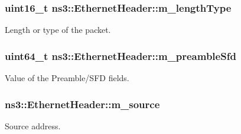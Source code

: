 \subsubsection[{\texorpdfstring{m\+\_\+length\+Type}{m_lengthType}}]{\setlength{\rightskip}{0pt plus 5cm}uint16\+\_\+t ns3\+::\+Ethernet\+Header\+::m\+\_\+length\+Type\hspace{0.3cm}{\ttfamily [private]}}\hypertarget{classns3_1_1EthernetHeader_a08ce14d49c74d332060686be27aff11f}{}\label{classns3_1_1EthernetHeader_a08ce14d49c74d332060686be27aff11f}


Length or type of the packet. 

\subsubsection[{\texorpdfstring{m\+\_\+preamble\+Sfd}{m_preambleSfd}}]{\setlength{\rightskip}{0pt plus 5cm}uint64\+\_\+t ns3\+::\+Ethernet\+Header\+::m\+\_\+preamble\+Sfd\hspace{0.3cm}{\ttfamily [private]}}\hypertarget{classns3_1_1EthernetHeader_ab0d0ceb81df7ef3fb6266bef57f43876}{}\label{classns3_1_1EthernetHeader_ab0d0ceb81df7ef3fb6266bef57f43876}


Value of the Preamble/\+S\+FD fields. 

\subsubsection[{\texorpdfstring{m\+\_\+source}{m_source}}]{ ns3\+::\+Ethernet\+Header\+::m\+\_\+source\hspace{0.3cm}{\ttfamily [private]}}\hypertarget{classns3_1_1EthernetHeader_a6994cb91754966d155c3c266238530c4}{}\label{classns3_1_1EthernetHeader_a6994cb91754966d155c3c266238530c4}


Source address. 


